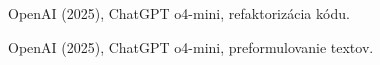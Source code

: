 \begin{trivlist}

\item OpenAI (2025), ChatGPT o4-mini, refaktorizácia kódu.

\item OpenAI (2025), ChatGPT o4-mini, preformulovanie textov.



\end{trivlist}

